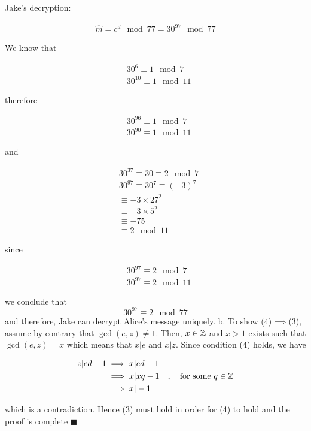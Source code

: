 \documentclass[10pt,letterpaper]{article}
\newcommand{\eqn}[2]{
\begin{equation}
\begin{split}
#1
\label{#2}
\end{split}
\end{equation}
}
\begin{document}
Jake's decryption:
\eqn{
\hat m=c^d\mod 77=30^{97}\mod 77
}{}
We know that
\eqn{
&30^{6}\equiv 1\mod 7
\\&
30^{10}\equiv 1\mod 11
}{}
therefore
\eqn{
&30^{96}\equiv 1\mod 7
\\&
30^{90}\equiv 1\mod 11
}{}
and
\eqn{
&30^{37}\equiv 30\equiv2\mod 7
\\&
30^{97}\equiv 30^7\equiv (-3)^7
\\&
\equiv -3\times 27^2
\\&
\equiv -3\times 5^2
\\&
\equiv -75
\\&
\equiv 2\mod 11
}{}
since
\eqn{
&30^{97}\equiv 2\mod 7
\\&30^{97}\equiv 2\mod 11
}{}
we conclude that
$$
30^{97}\equiv 2\mod 77
$$
and therefore, Jake can decrypt Alice's message uniquely.
\newline\newline
b. To show (4)$\implies$(3), assume by contrary that $\gcd(e,z)\ne 1$. Then, $x\in \Bbb Z$ and $x>1$ exists such that $\gcd(e,z)=x$ which means that $x|e$ and $x|z$. Since condition (4) holds, we have
\eqn{
z|ed-1&\implies x|ed-1
\\&
\implies x|xq-1\quad,\quad\text{for some }q\in\Bbb Z
\\&
\implies x|-1
}{}
which is a contradiction. Hence (3) must hold in order for (4) to hold and the proof is complete $\blacksquare$
\end{document}
